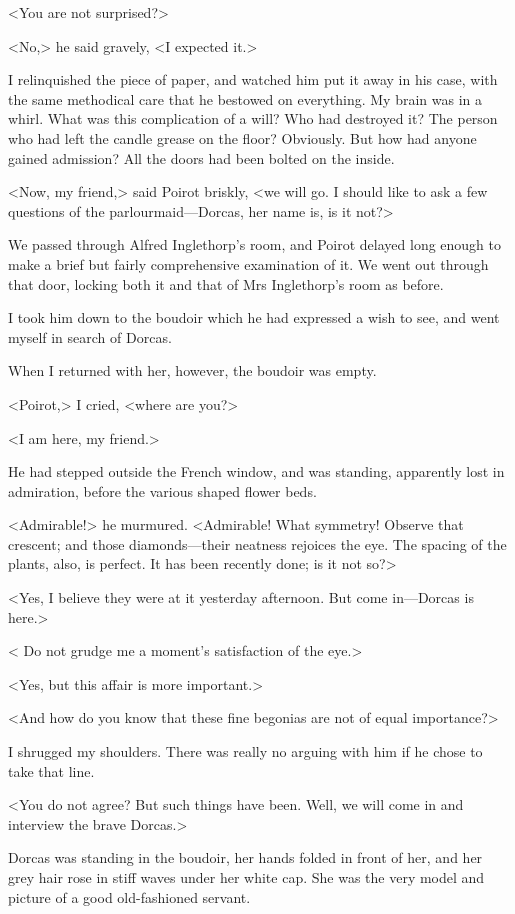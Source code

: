  <You are not surprised?> 

 <No,> he said gravely, <I expected it.> 

 I relinquished the piece of paper, and watched him put it away in his case, with the same methodical care that he bestowed on everything. My brain was in a whirl. What was this complication of a will? Who had destroyed it? The person who had left the candle grease on the floor? Obviously. But how had anyone gained admission? All the doors had been bolted on the inside. 

 <Now, my friend,> said Poirot briskly, <we will go. I should like to ask a few questions of the parlourmaid—Dorcas, her name is, is it not?> 

 We passed through Alfred Inglethorp's room, and Poirot delayed long enough to make a brief but fairly comprehensive examination of it. We went out through that door, locking both it and that of Mrs Inglethorp's room as before. 

 I took him down to the boudoir which he had expressed a wish to see, and went myself in search of Dorcas. 

 When I returned with her, however, the boudoir was empty. 

 <Poirot,> I cried, <where are you?> 

 <I am here, my friend.> 

 He had stepped outside the French window, and was standing, apparently lost in admiration, before the various shaped flower beds. 

 <Admirable!> he murmured. <Admirable! What symmetry! Observe that crescent; and those diamonds—their neatness rejoices the eye. The spacing of the plants, also, is perfect. It has been recently done; is it not so?> 

 <Yes, I believe they were at it yesterday afternoon. But come in—Dorcas is here.> 

 < Do not grudge me a moment's satisfaction of the eye.> 

 <Yes, but this affair is more important.> 

 <And how do you know that these fine begonias are not of equal importance?> 

 I shrugged my shoulders. There was really no arguing with him if he chose to take that line. 

 <You do not agree? But such things have been. Well, we will come in and interview the brave Dorcas.> 

 Dorcas was standing in the boudoir, her hands folded in front of her, and her grey hair rose in stiff waves under her white cap. She was the very model and picture of a good old-fashioned servant. 

